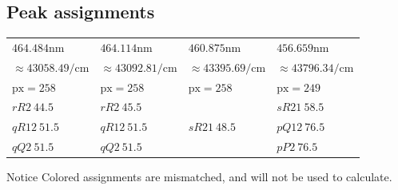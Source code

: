 \documentclass[aspectratio=43,scheme=plain]{ctexbeamer}
\begin{document}
\subsection{Peak assignments}
\begin{frame}{\insertsubsection}
			\begin{table}
			\centering  	 
			\scriptsize
			\begin{tabularx}{0.9\textwidth}{llll}   
				\toprule    
				$464.484 \unit{\nano \meter}$ &$464.114\unit{\nano \meter}$&$460.875 \unit{\nano \meter}$& $456.659 \unit{\nano \meter}$\\
				$\approx43058.49 \unit{\per \centi \meter}$ &   $\approx43092.81\unit{\per \centi \meter}$ &  $\approx 43395.69\unit{\per \centi \meter}$ & $\approx 43796.34\unit{\per \centi \meter} $\\
				\midrule    
				$\text{px}=258$ & $\text{px}=258$ & $\text{px}=258$ &$ \text{px}=249$ \\  
				\midrule 
				$rR2\:44.5$ & $rR2\:45.5$ &  &$sR21\:58.5$\\  
				\textcolor[RGB]{0,112,127}{$qR12\:51.5$} & \textcolor[RGB]{0,112,127}{$qR12 \:51.5$} &  $sR21\:48.5$ & \textcolor[RGB]{0,112,127}{$pQ12 \:76.5$} \\ 
				\textcolor[RGB]{0,112,127}{$qQ2\: 51.5$} & \textcolor[RGB]{0,112,127}{$qQ2\: 51.5$} &   & \textcolor[RGB]{0,112,127}{$pP2\: 76.5$} \\ 
				\bottomrule    
			\end{tabularx}%
			\label{tab:addlabel}%
		\end{table}%
		\begin{alertblock}{Notice}
			\textcolor[RGB]{0,112,127}{Colored} assignments are mismatched, and will not be used to calculate.
		\end{alertblock}
	\end{frame}
\end{document}
